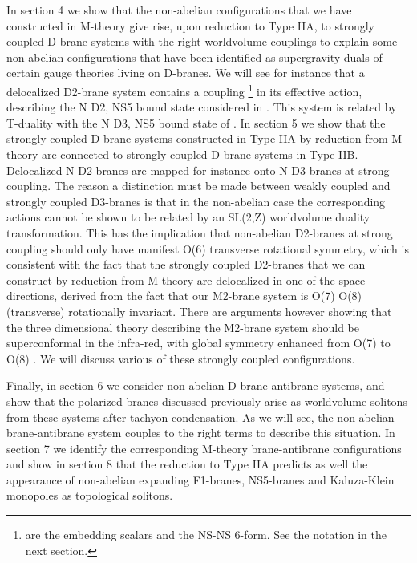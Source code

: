 \documentclass[12pt,a4paper]{article}
\begin{document}
In section 4 we show that the non-abelian configurations that we have
constructed in M-theory give rise, upon reduction to Type IIA, 
to strongly coupled D\coordHE{}-brane systems with the right
worldvolume couplings to
explain some non-abelian configurations that have been identified
as supergravity duals of certain gauge theories living on D-branes.
We will see for instance that a delocalized D2-brane system contains
a coupling \coordHE{} \footnote{\myHighlight{$\Phi$}\coordHE{} are the
embedding scalars and \coordHE{} the NS-NS 6-form. See the notation
in the next section.} in its effective action, describing the
N D2, NS5 bound state considered in \cite{Bena}. This system is
related by T-duality with the N D3, NS5 bound state of \cite{PS}.
In section 5 we show that the strongly coupled D\coordHE{}-brane systems
constructed in Type IIA by reduction from M-theory are connected to
strongly coupled D\coordHE{}-brane systems in Type IIB. Delocalized N D2-branes
are mapped for instance onto N D3-branes at strong coupling. The reason a 
distinction must be made between weakly coupled and strongly coupled
D3-branes is that in the non-abelian case the corresponding actions
cannot be shown to be related by an SL(2,Z) worldvolume duality
transformation. This has the implication that non-abelian D2-branes at
strong coupling should only have manifest O(6) transverse rotational 
symmetry, which is consistent with the fact that the strongly coupled
D2-branes that we can construct by reduction from M-theory are
delocalized in one of the space directions, derived from the fact that
our M2-brane system is O(7) \myHighlight{$\subset$}\coordHE{} O(8) (transverse) rotationally
invariant.
There are arguments however showing that the three dimensional theory
describing the M2-brane system
should be superconformal in the infra-red, with global symmetry
enhanced from O(7) to O(8) \cite{SS,BS}.
We will discuss various of these strongly coupled configurations. 

Finally, in section 6 we consider non-abelian D\coordHE{} brane-antibrane systems,
and show that the polarized branes discussed previously  
arise as worldvolume solitons from these systems after tachyon condensation.
As we will see,
the non-abelian brane-antibrane system couples to the right terms 
to describe this situation. In section 7
we identify the corresponding M-theory brane-antibrane configurations
and show in section 8 that the reduction to Type IIA predicts as well
the appearance
of non-abelian expanding F1-branes, 
NS5-branes and Kaluza-Klein monopoles as topological solitons.
\end{document}
